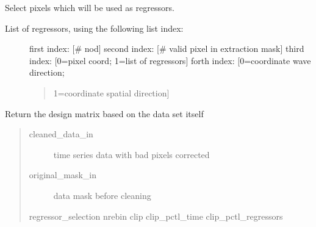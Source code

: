 \documentclass[a4paper,11pt,english]{sphinxmanual}
\begin{document}
\begin{fulllineitems}

\begin{fulllineitems}
\label{\detokenize{cascade.TSO:cascade.TSO.TSO.TSOSuite.select_regressors}}
Select pixels which will be used as regressors.
\begin{description}
\item[{List of regressors, using the following list index:}] \leavevmode
first index: {[}\# nod{]}
second index: {[}\# valid pixel in extraction mask{]}
third index: {[}0=pixel coord; 1=list of regressors{]}
forth index: {[}0=coordinate wave direction;
\begin{quote}

1=coordinate spatial direction{]}
\end{quote}

\end{description}

\end{fulllineitems}


\begin{fulllineitems}
\label{\detokenize{cascade.TSO:cascade.TSO.TSO.TSOSuite.get_design_matrix}}
Return the design matrix based on the data set itself
\begin{quote}
\begin{description}
\item[{cleaned\_data\_in}] \leavevmode
time series data with bad pixels corrected

\item[{original\_mask\_in}] \leavevmode
data mask before cleaning

\end{description}

regressor\_selection
nrebin
clip
clip\_pctl\_time
clip\_pctl\_regressors
\end{quote}
\begin{quote}


\end{quote}
\end{fulllineitems}
\end{fulllineitems}
\end{document}
